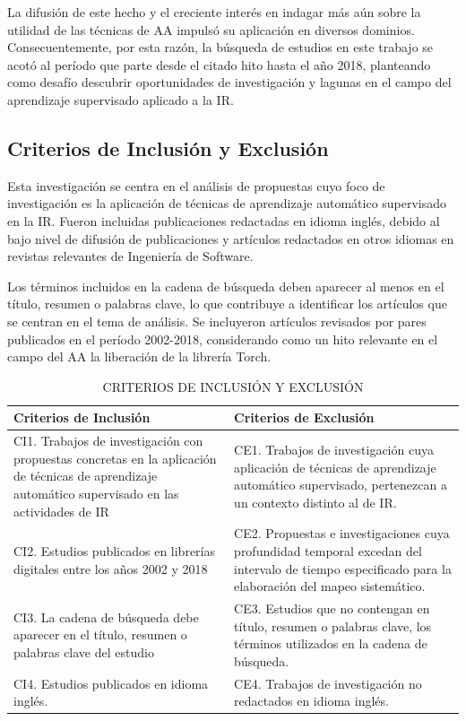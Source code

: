\documentclass[journal]{IEEEtran}
\begin{document}
La difusión de este hecho y el creciente interés en indagar más aún sobre la utilidad de las técnicas de AA impulsó su aplicación en diversos dominios. Consecuentemente, por esta razón, la búsqueda de estudios en este trabajo se acotó al período que parte desde el citado hito hasta el año 2018, planteando como desafío descubrir oportunidades de investigación y lagunas en el campo del aprendizaje supervisado aplicado a la IR.

\subsection{Criterios de Inclusión y Exclusión}

Esta investigación se centra en el análisis de propuestas cuyo foco de investigación es la aplicación de técnicas de aprendizaje automático supervisado en la IR. Fueron incluidas publicaciones redactadas en idioma inglés, debido al bajo nivel de difusión de publicaciones y artículos redactados en otros idiomas en revistas relevantes de Ingeniería de Software. 

Los términos incluidos en la cadena de búsqueda deben aparecer al menos en el título, resumen o palabras clave, lo que contribuye a identificar los artículos que se centran en el tema de análisis. Se incluyeron artículos revisados por pares publicados en el período 2002-2018, considerando como un hito relevante en el campo del AA la liberación de la librería Torch.

\begin{table}[!t]
\renewcommand{\arraystretch}{1.3}
\caption{CRITERIOS DE INCLUSIÓN Y EXCLUSIÓN}
\label{tabla2}
\centering
\begin{tabular}{p{3.5cm}p{4cm}}
\hline
\hline
Criterios de Inclusión & Criterios de Exclusión \\
\hline
CI1. Trabajos de investigación con propuestas concretas en la aplicación de técnicas de aprendizaje automático supervisado en las actividades de IR  & CE1. Trabajos de investigación cuya aplicación de técnicas de aprendizaje automático supervisado, pertenezcan a un contexto distinto al de IR.\\ \cline{1-2}
CI2. Estudios publicados en librerías digitales entre los años 2002 y 2018 & CE2. Propuestas e investigaciones
cuya profundidad temporal excedan del intervalo de tiempo especificado para la elaboración del mapeo sistemático. \\ \cline{1-2}
CI3. La cadena de búsqueda debe aparecer en el título, resumen o palabras clave del estudio & CE3. Estudios que no contengan en título, resumen o palabras clave, los términos utilizados en la cadena de búsqueda. \\ \cline{1-2}
CI4. Estudios publicados en idioma inglés. & CE4. Trabajos de investigación no redactados en idioma inglés. \\
\hline \hline                                                                                                    
\end{tabular}
\end{table}
\end{document}
